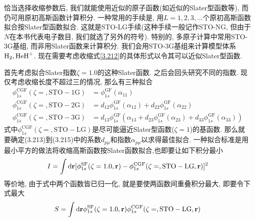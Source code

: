 恰当选择收缩参数后, 我们就能使用近似的原子\hft 函数(如近似的Slater型函数等), 而仍可用原初高斯函数计算积分. 一种常用的手续是, 用$L=1,2,3,\ldots$个原初高斯函数拟合按Slater型函数拟合. 这就是STO-LG手续(这种手续一般记作STO-NG, 但由于$N$在本书代表电子数目, 我们就选了另外的符号). 特别的, 多原子计算中常用STO-3G基组, 而非用Slater函数来计算积分. 我们会用STO-3G基组来计算模型体系$\mathrm{H}_2,\mathrm{HeH}^+$. 现在需要考虑收缩式\eqref{3.212}的具体形式以令其可以近似Slater型函数.

首先考虑拟合Slater指数$\zeta=1.0$的这种Slater函数. 之后会回头研究不同的指数. 现仅考虑收缩长度不超过三的情况, 那么有三种拟合
\begin{align}
\phi_{1s}^\mathrm{CGF}(\zeta=, \mathrm{STO-1G}) &= \phi_{1s}^\mathrm{GF}(\alpha_{11})\\
\phi_{1s}^\mathrm{CGF}(\zeta=, \mathrm{STO-2G}) &= d_{12}\phi_{1s}^\mathrm{GF}(\alpha_{12}) + d_{22}\phi_{1s}^\mathrm{GF}(\alpha_{22})\\
\phi_{1s}^\mathrm{CGF}(\zeta=, \mathrm{STO-3G}) &= d_{13}\phi_{1s}^\mathrm{GF}(\alpha_{13}+ d_{23}\phi_{1s}^\mathrm{GF}(\alpha_{23}) + d_{33}\phi_{1s}^\mathrm{GF}(\alpha_{33}))
\end{align}
式中$\phi_{1s}^\mathrm{CGF}(\zeta=, \mathrm{STO-LG})$是尽可能逼近Slater型函数($\zeta=1$)的基函数. 那么就要确定(3.213)到(3.215)中的系数$d_{p\mu}$和指数$\alpha_{p\mu}$以求得最佳拟合. 一种拟合标准是用最小平方的做法将收缩高斯函数按Slater函数拟合,也即要让如下积分最小
\begin{align}
I = \int\dd{r}[\phi_{1s}^\mathrm{SF}(\zeta=1.0,\bfr) - \phi_{1s}^\mathrm{CGF}(\zeta=, \mathrm{STO-LG},\bfr)]^2
\end{align}
等价地, 由于式中两个函数皆已归一化, 就是要使两函数间重叠积分最大, 即要令下式最大
\begin{align}
S = \int\dd{r}\phi_{1s}^\mathrm{SF}(\zeta=1.0,\bfr)\phi_{1s}^\mathrm{CGF}(\zeta=, \mathrm{STO-LG},\bfr)
\end{align}


